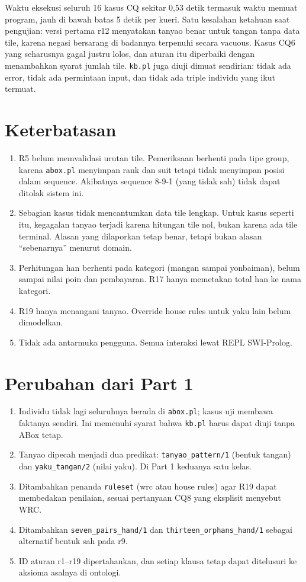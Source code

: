 \documentclass[11pt,a4paper]{article}
\newcommand{\code}[1]{\texttt{#1}}
\begin{document}
Waktu eksekusi seluruh 16 kasus CQ sekitar 0,53 detik termasuk waktu memuat program, jauh
di bawah batas 5 detik per kueri. Satu kesalahan ketahuan saat pengujian: versi pertama r12
menyatakan tanyao benar untuk tangan tanpa data tile, karena negasi bersarang di badannya
terpenuhi secara vacuous. Kasus CQ6 yang seharusnya gagal justru lolos, dan aturan itu
diperbaiki dengan menambahkan syarat jumlah tile. \code{kb.pl} juga diuji dimuat sendirian: tidak ada error, tidak ada permintaan input,
dan tidak ada triple individu yang ikut termuat.

\section{Keterbatasan}
\label{sec:keterbatasan}

\begin{enumerate}
\item R5 belum memvalidasi urutan tile. Pemeriksaan berhenti pada tipe group, karena
      \code{abox.pl} menyimpan rank dan suit tetapi tidak menyimpan posisi dalam sequence.
      Akibatnya sequence 8-9-1 (yang tidak sah) tidak dapat ditolak sistem ini.
\item Sebagian kasus tidak mencantumkan data tile lengkap. Untuk kasus seperti itu,
      kegagalan tanyao terjadi karena hitungan tile nol, bukan karena ada tile terminal.
      Alasan yang dilaporkan tetap benar, tetapi bukan alasan ``sebenarnya'' menurut domain.
\item Perhitungan han berhenti pada kategori (mangan sampai yonbaiman), belum sampai nilai
      poin dan pembayaran. R17 hanya memetakan total han ke nama kategori.
\item R19 hanya menangani tanyao. Override house rules untuk yaku lain belum dimodelkan.
\item Tidak ada antarmuka pengguna. Semua interaksi lewat REPL SWI-Prolog.
\end{enumerate}

\section{Perubahan dari Part 1}

\begin{enumerate}
\item Individu tidak lagi seluruhnya berada di \code{abox.pl}; kasus uji membawa faktanya
      sendiri. Ini memenuhi syarat bahwa \code{kb.pl} harus dapat diuji tanpa ABox tetap.
\item Tanyao dipecah menjadi dua predikat: \code{tanyao_pattern/1} (bentuk tangan) dan
      \code{yaku_tangan/2} (nilai yaku). Di Part 1 keduanya satu kelas.
\item Ditambahkan penanda \code{ruleset} (wrc atau house rules) agar R19 dapat membedakan
      penilaian, sesuai pertanyaan CQ8 yang eksplisit menyebut WRC.
\item Ditambahkan \code{seven_pairs_hand/1} dan \code{thirteen_orphans_hand/1} sebagai
      alternatif bentuk sah pada r9.
\item ID aturan r1--r19 dipertahankan, dan setiap klausa tetap dapat ditelusuri ke
      aksioma asalnya di ontologi.
\end{enumerate}
\end{document}
